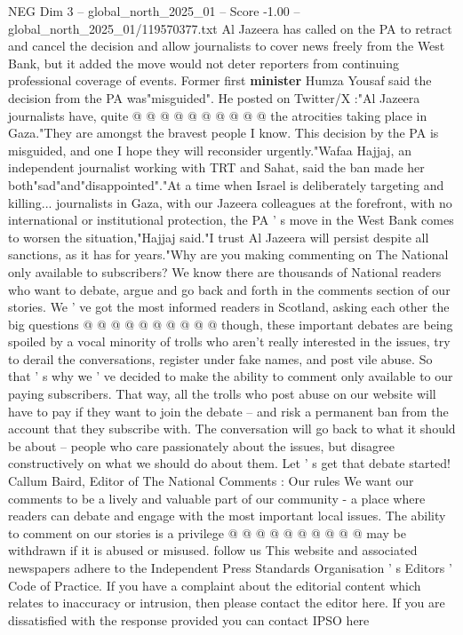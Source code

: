 \begin{textsample}{NEG Dim 3 – global\_north\_2025\_01 – Score -1.00 – global\_north\_2025\_01/119570377.txt}
Al Jazeera has called on the PA to retract and cancel the decision and allow journalists to cover news freely from the West Bank, but it added the move would not deter reporters from continuing professional coverage of events.
Former first \textbf{minister} Humza Yousaf said the decision from the PA was"misguided".
He posted on Twitter/X :"Al Jazeera journalists have, quite @ @ @ @ @ @ @ @ @ @ the atrocities taking place in Gaza."They are amongst the bravest people I know.
This decision by the PA is misguided, and one I hope they will reconsider urgently."Wafaa Hajjaj, an independent journalist working with TRT and Sahat, said the ban made her both"sad"and"disappointed"."At a time when Israel is deliberately targeting and killing... journalists in Gaza, with our Jazeera colleagues at the forefront, with no international or institutional protection, the PA ' s move in the West Bank comes to worsen the situation,"Hajjaj said."I trust Al Jazeera will persist despite all sanctions, as it has for years."Why are you making commenting on The National only available to subscribers?
We know there are thousands of National readers who want to debate, argue and go back and forth in the comments section of our stories.
We ' ve got the most informed readers in Scotland, asking each other the big questions @ @ @ @ @ @ @ @ @ @ though, these important debates are being spoiled by a vocal minority of trolls who aren't really interested in the issues, try to derail the conversations, register under fake names, and post vile abuse.
So that ' s why we ' ve decided to make the ability to comment only available to our paying subscribers.
That way, all the trolls who post abuse on our website will have to pay if they want to join the debate -- and risk a permanent ban from the account that they subscribe with.
The conversation will go back to what it should be about -- people who care passionately about the issues, but disagree constructively on what we should do about them.
Let ' s get that debate started!
Callum Baird, Editor of The National Comments : Our rules We want our comments to be a lively and valuable part of our community - a place where readers can debate and engage with the most important local issues.
The ability to comment on our stories is a privilege @ @ @ @ @ @ @ @ @ @ may be withdrawn if it is abused or misused. follow us This website and associated newspapers adhere to the Independent Press Standards Organisation ' s Editors ' Code of Practice.
If you have a complaint about the editorial content which relates to inaccuracy or intrusion, then please contact the editor here.
If you are dissatisfied with the response provided you can contact IPSO here

\end{textsample}
